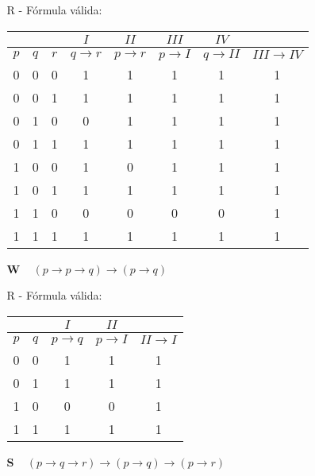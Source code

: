 \documentclass[12pt,a4paper,oneside]{article}
\begin{document}
\begin{enumerate}
\begin{enumerate}
			{\color{verde} R - Fórmula válida:
			\begin{center}
				\begin{tabular}{ccc|c|c|c|c|c}
				 &  &  & $I$ & $II$ & $III$ & $IV$ & \\
				 \hline
				$p$ & $q$ & $r$ & $q \rightarrow r$ & $p \rightarrow r$ & $p \rightarrow I$ & $q \rightarrow II$ & $III \rightarrow IV$\\ 
				\hline 
				0 & 0 & 0 & 1 & 1 & 1 & 1 & 1 \\ 
				0 & 0 & 1 & 1 & 1 & 1 & 1 & 1 \\  
				0 & 1 & 0 & 0 & 1 & 1 & 1 & 1 \\  
				0 & 1 & 1 & 1 & 1 & 1 & 1 & 1 \\  
				1 & 0 & 0 & 1 & 0 & 1 & 1 & 1 \\ 
				1 & 0 & 1 & 1 & 1 & 1 & 1 & 1 \\  
				1 & 1 & 0 & 0 & 0 & 0 & 0 & 1 \\  
				1 & 1 & 1 & 1 & 1 & 1 & 1 & 1 \\  
				\hline 
				\end{tabular}  
			\end{center} 
			}
			\item[\bf W] \mbox{ } $(p \rightarrow p \rightarrow q) \rightarrow (p \rightarrow q)$

			{\color{verde} R - Fórmula válida:
			\begin{center}
				\begin{tabular}{c|c|c|c|c}
				 &  & $I$ & $II$ &  \\ 
				\hline 
				$p$ & $q$ & $p \rightarrow q$ & $p \rightarrow I$ & $II \rightarrow I$ \\ 
				\hline 
				0 & 0 & 1 & 1 & 1 \\ 
				0 & 1 & 1 & 1 & 1 \\ 
				1 & 0 & 0 & 0 & 1 \\ 
				1 & 1 & 1 & 1 & 1 \\ 
				\hline 
				\end{tabular} 
			\end{center} 
			}
			\item[\bf S] \mbox{ } $(p \rightarrow q \rightarrow r) \rightarrow (p \rightarrow q) \rightarrow (p \rightarrow r)$
			

\end{enumerate}
\end{enumerate}
\end{document}
